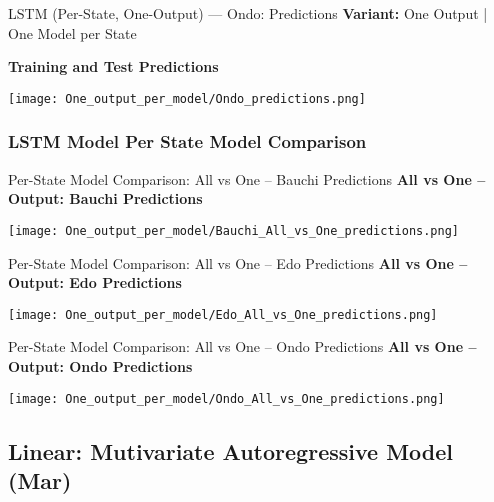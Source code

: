 \documentclass{beamer}
\begin{document}
\begin{frame}{LSTM (Per-State, One-Output) — Ondo: Predictions}
\textbf{Variant:} One Output | One Model per State
\vspace{0.5em}

\textbf{Training and Test Predictions}
\begin{center}
    \texttt{[image: One\_output\_per\_model/Ondo\_predictions.png]}
\end{center}
\end{frame}

\subsubsection{LSTM Model Per State Model Comparison}
\begin{frame}{Per-State Model Comparison: All vs One – Bauchi Predictions}
\textbf{All vs One – Output: Bauchi Predictions}
\begin{center}
    \texttt{[image: One\_output\_per\_model/Bauchi\_All\_vs\_One\_predictions.png]}
\end{center}
\end{frame}

\begin{frame}{Per-State Model Comparison: All vs One – Edo Predictions}
\textbf{All vs One – Output: Edo Predictions}
\begin{center}
    \texttt{[image: One\_output\_per\_model/Edo\_All\_vs\_One\_predictions.png]}
\end{center}
\end{frame}

\begin{frame}{Per-State Model Comparison: All vs One – Ondo Predictions}
\textbf{All vs One – Output: Ondo Predictions}
\begin{center}
    \texttt{[image: One\_output\_per\_model/Ondo\_All\_vs\_One\_predictions.png]}
\end{center}
\end{frame}


\subsection{Linear: Mutivariate Autoregressive Model (Mar)}
\end{document}
